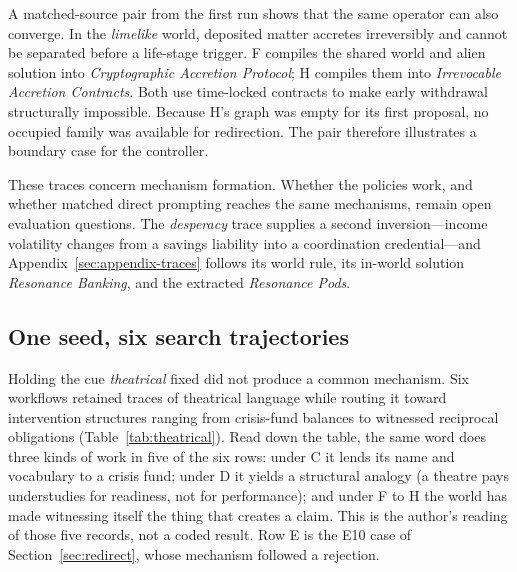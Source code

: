 \documentclass[11pt,a4paper]{article}
\begin{document}
A matched-source pair from the first run shows that the same operator can also converge. In the \emph{limelike} world, deposited matter accretes irreversibly and cannot be separated before a life-stage trigger. F compiles the shared world and alien solution into \emph{Cryptographic Accretion Protocol}; H compiles them into \emph{Irrevocable Accretion Contracts}. Both use time-locked contracts to make early withdrawal structurally impossible. Because H's graph was empty for its first proposal, no occupied family was available for redirection. The pair therefore illustrates a boundary case for the controller.

These traces concern mechanism formation. Whether the policies work, and whether matched direct prompting reaches the same mechanisms, remain open evaluation questions. The \emph{desperacy} trace supplies a second inversion---income volatility changes from a savings liability into a coordination credential---and Appendix~\ref{sec:appendix-traces} follows its world rule, its in-world solution \emph{Resonance Banking}, and the extracted \emph{Resonance Pods}.

\subsection{One seed, six search trajectories}

Holding the cue \emph{theatrical} fixed did not produce a common mechanism. Six workflows retained traces of theatrical language while routing it toward intervention structures ranging from crisis-fund balances to witnessed reciprocal obligations (Table~\ref{tab:theatrical}). Read down the table, the same word does three kinds of work in five of the six rows: under C it lends its name and vocabulary to a crisis fund; under D it yields a structural analogy (a theatre pays understudies for readiness, not for performance); and under F to H the world has made witnessing itself the thing that creates a claim. This is the author's reading of those five records, not a coded result. Row E is the E10 case of Section~\ref{sec:redirect}, whose mechanism followed a rejection.
\end{document}

